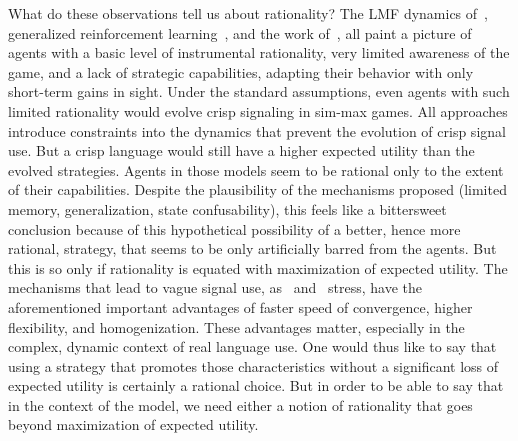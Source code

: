 \documentclass[a4paper]{article}
\begin{document}
What do these observations tell us about rationality?
The LMF dynamics of~\textcite{franke_vagueness_2011}, generalized reinforcement learning~\parencite{oconnor_evolution_2014}, and the work of~\textcite{franke_vagueness_2017}, all paint a picture of agents with a basic level of instrumental rationality, very limited awareness of the game, and a lack of strategic capabilities, adapting their behavior with only short-term gains in sight.
Under the standard assumptions, even agents with such limited rationality would evolve crisp signaling in sim-max games.
All approaches introduce constraints into the dynamics that prevent the evolution of crisp signal use.
But a crisp language would still have a higher expected utility than the evolved strategies.
Agents in those models seem to be rational only to the extent of their capabilities.
Despite the plausibility of the mechanisms proposed (limited memory, generalization, state confusability), this feels like a bittersweet conclusion because of this hypothetical possibility of a better, hence more rational, strategy, that seems to be only artificially barred from the agents.
But this is so only if rationality is equated with maximization of expected utility.
The mechanisms that lead to vague signal use, as~\textcite{oconnor_evolution_2014} and~\textcite{franke_vagueness_2017} stress, have the aforementioned important advantages of faster speed of convergence, higher flexibility, and homogenization.
These advantages matter, especially in the complex, dynamic context of real language use.
One would thus like to say that using a strategy that promotes those characteristics without a significant loss of expected utility is certainly a rational choice.
But in order to be able to say that in the context of the model, we need either a notion of rationality that goes beyond maximization of expected utility.
\end{document}
